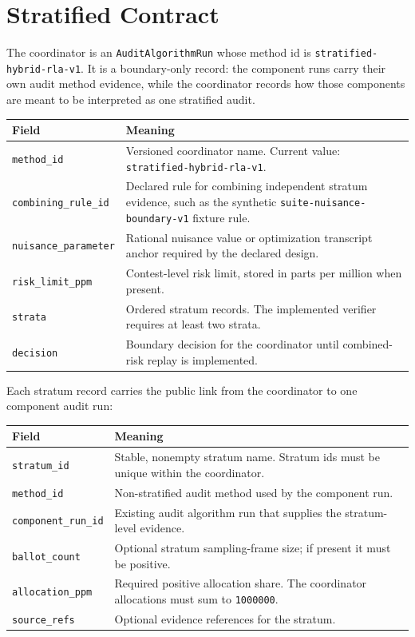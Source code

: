 \section{Stratified Contract}

The coordinator is an \texttt{AuditAlgorithmRun} whose method id is
\texttt{stratified-hybrid-rla-v1}. It is a boundary-only record: the component
runs carry their own audit method evidence, while the coordinator records how
those components are meant to be interpreted as one stratified audit.

\begin{center}
\small
\begin{tabularx}{\textwidth}{lX}
\toprule
Field & Meaning \\
\midrule
\texttt{method\_id} & Versioned coordinator name. Current value: \texttt{stratified-hybrid-rla-v1}. \\
\texttt{combining\_rule\_id} & Declared rule for combining independent stratum evidence, such as the synthetic \texttt{suite-nuisance-boundary-v1} fixture rule. \\
\texttt{nuisance\_parameter} & Rational nuisance value or optimization transcript anchor required by the declared design. \\
\texttt{risk\_limit\_ppm} & Contest-level risk limit, stored in parts per million when present. \\
\texttt{strata} & Ordered stratum records. The implemented verifier requires at least two strata. \\
\texttt{decision} & Boundary decision for the coordinator until combined-risk replay is implemented. \\
\bottomrule
\end{tabularx}
\end{center}

Each stratum record carries the public link from the coordinator to one
component audit run:

\begin{center}
\small
\begin{tabularx}{\textwidth}{lX}
\toprule
Field & Meaning \\
\midrule
\texttt{stratum\_id} & Stable, nonempty stratum name. Stratum ids must be unique within the coordinator. \\
\texttt{method\_id} & Non-stratified audit method used by the component run. \\
\texttt{component\_run\_id} & Existing audit algorithm run that supplies the stratum-level evidence. \\
\texttt{ballot\_count} & Optional stratum sampling-frame size; if present it must be positive. \\
\texttt{allocation\_ppm} & Required positive allocation share. The coordinator allocations must sum to \texttt{1000000}. \\
\texttt{source\_refs} & Optional evidence references for the stratum. \\
\bottomrule
\end{tabularx}
\end{center}

